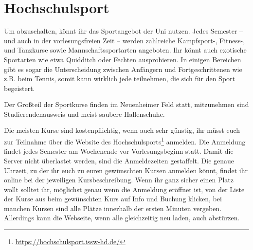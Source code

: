 \section{Hochschulsport}
Um abzuschalten, könnt ihr das Sportangebot der Uni nutzen. Jedes Semester -- und auch in der vorlesungsfreien Zeit -- werden zahlreiche Kampfsport-, Fitness-, und Tanzkurse sowie Mannschaftssportarten angeboten. Ihr könnt auch exotische Sportarten wie etwa Quidditch oder Fechten ausprobieren. In einigen Bereichen gibt es sogar die Unterscheidung zwischen Anfängern und Fortgeschrittenen wie z.B. beim Tennis, somit kann wirklich jede teilnehmen, die sich für den Sport begeistert.

Der Großteil der Sportkurse finden im Neuenheimer Feld statt, mitzunehmen sind Studierendenausweis und meist saubere Hallenschuhe.

Die meisten Kurse sind kostenpflichtig, wenn auch sehr günstig, ihr müsst euch zur Teilnahme über die Website des Hochschulsports\footnote{\url{https://hochschulsport.issw-hd.de/}} anmelden. Die Anmeldung findet jedes Semester am Wochenende vor Vorlesungsbeginn statt. Damit die Server nicht überlastet werden, sind die Anmeldezeiten gestaffelt. Die genaue Uhrzeit, zu der ihr euch zu euren gewünschten Kursen anmelden könnt, findet ihr online bei der jeweiligen Kursbeschreibung. Wenn ihr ganz sicher einen Platz wollt solltet ihr, möglichst genau wenn die Anmeldung eröffnet ist, von der Liste der Kurse aus beim gewünschten Kurs auf Info und Buchung klicken, bei manchen Kursen sind alle Plätze innerhalb der ersten Minuten vergeben. Allerdings kann die Webseite, wenn alle gleichzeitig neu laden, auch abstürzen.
